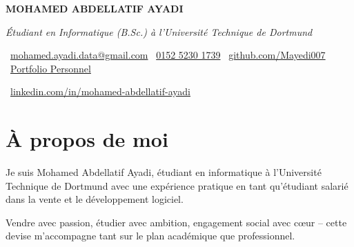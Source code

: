 \documentclass[10pt, letterpaper]{article}
\newenvironment{header}{
    \setlength{\topsep}{0pt}\par\kern\topsep\centering\linespread{1.5}
}{
    \par\kern\topsep
} %
\begin{document}
    \newcommand{\AND}{\unskip
        \cleaders\copy\ANDbox\hskip\wd\ANDbox
        \ignorespaces
    }
    \newsavebox\ANDbox
    \sbox\ANDbox{$|$}

    \begin{header}
   \begin{center}

    \vspace{0.5cm} %
    {\fontsize{20pt}{24pt}\selectfont \textbf{MOHAMED ABDELLATIF AYADI}}
\end{center}
        
\vspace{5 pt}

    \normalsize
    \textit{Étudiant en Informatique (B.Sc.) à l'Université Technique de Dortmund}

        \vspace{5 pt}

      \faEnvelope\ \href{mailto:mohamed.ayadi.data@gmail.com}{\textcolor{primaryColor}{mohamed.ayadi.data@gmail.com}} \quad
\faPhone\ \href{tel:+49-152-5230-1739}{\textcolor{primaryColor}{0152 5230 1739}} \quad
\faGithub\ \href{https://github.com/Mayedi007}{\textcolor{primaryColor}{github.com/Mayedi007}} \quad
\faGlobe\ \href{https://personal-portfolio-mohamedayadidat.replit.app}{\textcolor{portfolioColor}{Portfolio Personnel}} \quad

\faLinkedin\ \href{https://linkedin.com/in/mohamed-abdellatif-ayadi}{\textcolor{primaryColor}{linkedin.com/in/mohamed-abdellatif-ayadi}}

    \end{header}

    \vspace{1cm}

\section*{À propos de moi}

Je suis Mohamed Abdellatif Ayadi, étudiant en informatique à l'Université Technique de Dortmund avec une expérience pratique en tant qu'étudiant salarié dans la vente et le développement logiciel.

Vendre avec passion, étudier avec ambition, engagement social avec cœur – cette devise m'accompagne tant sur le plan académique que professionnel.
\end{document}
